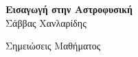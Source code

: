 \begin{titlepage}


\begingroup
\thispagestyle{empty}
\centering
\vspace*{5cm}
\par\normalfont\fontsize{35}{35}\sffamily\selectfont
\textbf{Εισαγωγή στην Αστροφυσική}\\
{\LARGE Σάββας Χανλαρίδης}\par %
\vspace*{1cm}
{\Huge Σημειώσεις Μαθήματος}\par %
\endgroup







\end{titlepage}
